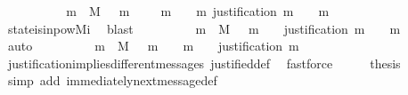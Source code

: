 \begin{isabellebody}
%
\isadelimproof
%
\endisadelimproof
%
\isatagproof
{}\isamarkupfalse%
\ {\isacharminus}\ \isanewline
\ \ \isamarkupfalse%
\ {\isachardoublequoteopen}{\isasymforall}\ {\isasymsigma}\ {\isasymin}{\isasymSigma}{\isachardot}\ {\isasymforall}\ m\ {\isasymin}\ M{\isachardot}\ {\isasymsigma}\ {\isasymunion}\ {\isacharbraceleft}m{\isacharbraceright}\ {\isasymin}\ {\isasymSigma}\ {\isasymlongrightarrow}\ {\isacharparenleft}{\isasymforall}\ m{\isacharprime}\ {\isasymin}\ {\isasymsigma}\ {\isasymunion}\ {\isacharbraceleft}m{\isacharbraceright}{\isachardot}\ justification\ m{\isacharprime}\ {\isasymsubseteq}\ {\isasymsigma}\ {\isasymunion}\ {\isacharbraceleft}m{\isacharbraceright}{\isacharparenright}{\isachardoublequoteclose}\isanewline
\ \ \ \ \isamarkupfalse%
\ state{\isacharunderscore}is{\isacharunderscore}in{\isacharunderscore}pow{\isacharunderscore}Mi\ \isamarkupfalse%
\ blast\isanewline
\ \ \isamarkupfalse%
\ \isamarkupfalse%
\ {\isachardoublequoteopen}{\isasymforall}\ {\isasymsigma}\ {\isasymin}{\isasymSigma}{\isachardot}\ {\isasymforall}\ m\ {\isasymin}\ M{\isachardot}\ {\isasymsigma}\ {\isasymunion}\ {\isacharbraceleft}m{\isacharbraceright}\ {\isasymin}\ {\isasymSigma}\ {\isasymlongrightarrow}\ justification\ m\ {\isasymsubseteq}\ {\isasymsigma}\ {\isasymunion}\ {\isacharbraceleft}m{\isacharbraceright}{\isachardoublequoteclose}\isanewline
\ \ \ \ \isamarkupfalse%
\ auto\isanewline
\ \ \isamarkupfalse%
\ \isamarkupfalse%
\ {\isachardoublequoteopen}{\isasymforall}\ {\isasymsigma}\ {\isasymin}{\isasymSigma}{\isachardot}\ {\isasymforall}\ m\ {\isasymin}\ M{\isachardot}\ {\isasymsigma}\ {\isasymunion}\ {\isacharbraceleft}m{\isacharbraceright}\ {\isasymin}\ {\isasymSigma}\ {\isasymand}\ m\ {\isasymnotin}\ {\isasymsigma}\ {\isasymlongrightarrow}\ justification\ m\ {\isasymsubseteq}\ {\isasymsigma}{\isachardoublequoteclose}\isanewline
\ \ \ \ \isamarkupfalse%
\ justification{\isacharunderscore}implies{\isacharunderscore}different{\isacharunderscore}messages\ justified{\isacharunderscore}def\ \isamarkupfalse%
\ fastforce\isanewline
\ \ \isamarkupfalse%
\ \isamarkupfalse%
\ {\isacharquery}thesis\isanewline
\ \ \ \ \isamarkupfalse%
\ {\isacharparenleft}simp\ add{\isacharcolon}\ immediately{\isacharunderscore}next{\isacharunderscore}message{\isacharunderscore}def{\isacharparenright}\isanewline
{}\isamarkupfalse%
%
\endisatagproof

\end{isabellebody}
